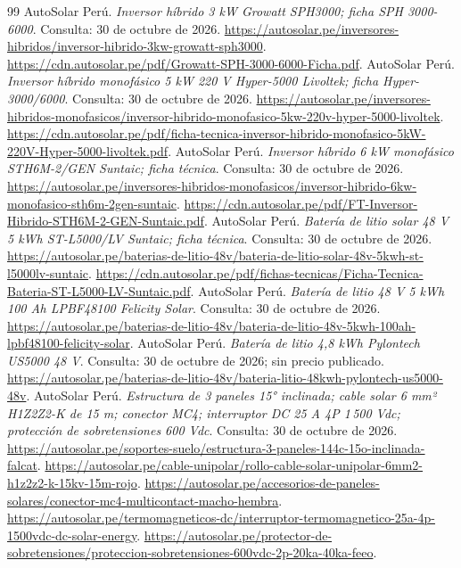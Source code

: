 \begin{thebibliography}{99}
 AutoSolar Perú. \emph{Inversor híbrido 3 kW Growatt SPH3000; ficha SPH 3000-6000}. Consulta: 30 de octubre de 2026. \url{https://autosolar.pe/inversores-hibridos/inversor-hibrido-3kw-growatt-sph3000}. \url{https://cdn.autosolar.pe/pdf/Growatt-SPH-3000-6000-Ficha.pdf}.
 AutoSolar Perú. \emph{Inversor híbrido monofásico 5 kW 220 V Hyper-5000 Livoltek; ficha Hyper-3000/6000}. Consulta: 30 de octubre de 2026. \url{https://autosolar.pe/inversores-hibridos-monofasicos/inversor-hibrido-monofasico-5kw-220v-hyper-5000-livoltek}. \url{https://cdn.autosolar.pe/pdf/ficha-tecnica-inversor-hibrido-monofasico-5kW-220V-Hyper-5000-livoltek.pdf}.
 AutoSolar Perú. \emph{Inversor híbrido 6 kW monofásico STH6M-2/GEN Suntaic; ficha técnica}. Consulta: 30 de octubre de 2026. \url{https://autosolar.pe/inversores-hibridos-monofasicos/inversor-hibrido-6kw-monofasico-sth6m-2gen-suntaic}. \url{https://cdn.autosolar.pe/pdf/FT-Inversor-Hibrido-STH6M-2-GEN-Suntaic.pdf}.
 AutoSolar Perú. \emph{Batería de litio solar 48 V 5 kWh ST-L5000/LV Suntaic; ficha técnica}. Consulta: 30 de octubre de 2026. \url{https://autosolar.pe/baterias-de-litio-48v/bateria-de-litio-solar-48v-5kwh-st-l5000lv-suntaic}. \url{https://cdn.autosolar.pe/pdf/fichas-tecnicas/Ficha-Tecnica-Bateria-ST-L5000-LV-Suntaic.pdf}.
 AutoSolar Perú. \emph{Batería de litio 48 V 5 kWh 100 Ah LPBF48100 Felicity Solar}. Consulta: 30 de octubre de 2026. \url{https://autosolar.pe/baterias-de-litio-48v/bateria-de-litio-48v-5kwh-100ah-lpbf48100-felicity-solar}.
 AutoSolar Perú. \emph{Batería de litio 4,8 kWh Pylontech US5000 48 V}. Consulta: 30 de octubre de 2026; sin precio publicado. \url{https://autosolar.pe/baterias-de-litio-48v/bateria-litio-48kwh-pylontech-us5000-48v}.
 AutoSolar Perú. \emph{Estructura de 3 paneles 15° inclinada; cable solar 6 mm² H1Z2Z2-K de 15 m; conector MC4; interruptor DC 25 A 4P 1\,500 Vdc; protección de sobretensiones 600 Vdc}. Consulta: 30 de octubre de 2026. \url{https://autosolar.pe/soportes-suelo/estructura-3-paneles-144c-15o-inclinada-falcat}. \url{https://autosolar.pe/cable-unipolar/rollo-cable-solar-unipolar-6mm2-h1z2z2-k-15kv-15m-rojo}. \url{https://autosolar.pe/accesorios-de-paneles-solares/conector-mc4-multicontact-macho-hembra}. \url{https://autosolar.pe/termomagneticos-dc/interruptor-termomagnetico-25a-4p-1500vdc-dc-solar-energy}. \url{https://autosolar.pe/protector-de-sobretensiones/proteccion-sobretensiones-600vdc-2p-20ka-40ka-feeo}.

\end{thebibliography}
